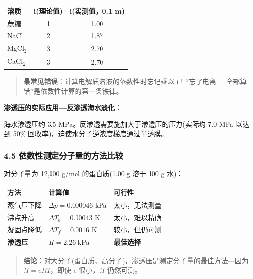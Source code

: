 {\def\LTcaptype{none} %
\begin{longtable}[]{@{}lcc@{}}
\toprule\noalign{}
溶质 & i(理论值) & i(实测值，0.1 m) \\
\midrule\noalign{}
\endhead
\bottomrule\noalign{}
\endlastfoot
蔗糖 & 1 & 1.00 \\
NaCl & 2 & 1.87 \\
MgCl\textsubscript{2} & 3 & 2.70 \\
CaCl\textsubscript{2} & 3 & 2.70 \\
\end{longtable}
}

\begin{quote}
\textbf{最常见错误}：计算电解质溶液的依数性时忘记乘以 i！``忘了电离 = 全部算错''是依数性计算的第一条铁律。
\end{quote}

\textbf{渗透压的实际应用---反渗透海水淡化}：

海水渗透压约 3.5 MPa。反渗透需要施加大于渗透压的压力(实际约 7.0 MPa 以达到 50\% 回收率)，迫使水分子逆浓度梯度通过半透膜。

\subsubsection{4.5 依数性测定分子量的方法比较}\label{ux4f9dux6570ux6027ux6d4bux5b9aux5206ux5b50ux91cfux7684ux65b9ux6cd5ux6bd4ux8f83}

对分子量为 12,000 g/mol 的蛋白质(1.00 g 溶于 100 g 水)：

{\def\LTcaptype{none} %
\begin{longtable}[]{@{}lll@{}}
\toprule\noalign{}
方法 & 计算值 & 可行性 \\
\midrule\noalign{}
\endhead
\bottomrule\noalign{}
\endlastfoot
蒸气压下降 & \(\Delta p = 0.000046\) kPa & 太小，无法测量 \\
沸点升高 & \(\Delta T_b = 0.00043\) K & 太小，难以精确 \\
凝固点降低 & \(\Delta T_f = 0.0016\) K & 较小，但仍可测 \\
\textbf{渗透压} & \(\Pi = 2.26\) kPa & \textbf{最佳选择} \\
\end{longtable}
}

\begin{quote}
\textbf{结论}：对大分子(蛋白质、高分子)，渗透压是测定分子量的最佳方法---因为 \(\Pi = cRT\)，即使 c 很小，\(\Pi\) 仍然可测。
\end{quote}

